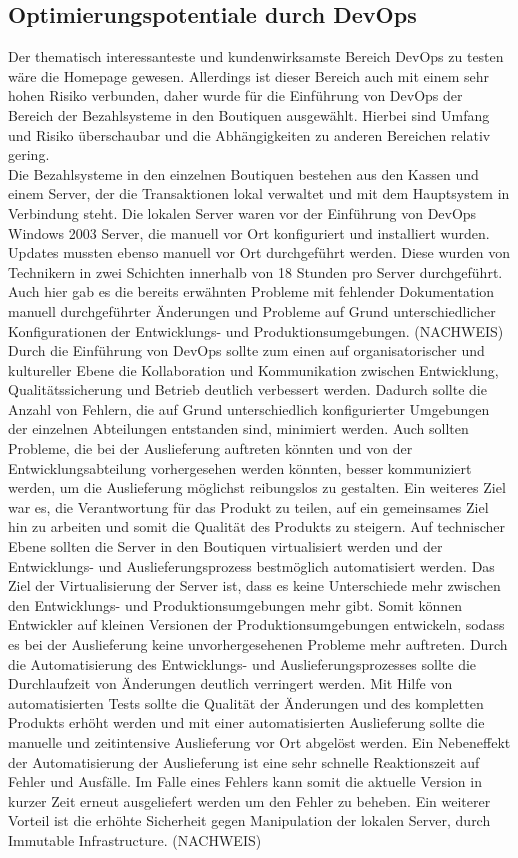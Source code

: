 \subsection{Optimierungspotentiale durch DevOps}
Der thematisch interessanteste und kundenwirksamste Bereich DevOps zu testen wäre die Homepage gewesen. Allerdings ist dieser Bereich auch mit einem sehr hohen Risiko verbunden, daher wurde für die Einführung von DevOps der Bereich der Bezahlsysteme in den Boutiquen ausgewählt. Hierbei sind Umfang und Risiko überschaubar und die Abhängigkeiten zu anderen Bereichen relativ gering.\\
Die Bezahlsysteme in den einzelnen Boutiquen bestehen aus den Kassen und einem Server, der die Transaktionen lokal verwaltet und mit dem Hauptsystem in Verbindung steht. Die lokalen Server waren vor der Einführung von DevOps Windows 2003 Server, die manuell vor Ort konfiguriert und installiert wurden. Updates mussten ebenso manuell vor Ort durchgeführt werden. Diese wurden von Technikern in zwei Schichten innerhalb von 18 Stunden pro Server durchgeführt. Auch hier gab es die bereits erwähnten Probleme mit fehlender Dokumentation manuell durchgeführter Änderungen und Probleme auf Grund unterschiedlicher Konfigurationen der Entwicklungs- und Produktionsumgebungen. (NACHWEIS)\\ 
Durch die Einführung von DevOps sollte zum einen auf organisatorischer und kultureller Ebene die Kollaboration und Kommunikation zwischen Entwicklung, Qualitätssicherung und Betrieb deutlich verbessert werden. Dadurch sollte die Anzahl von Fehlern, die auf Grund unterschiedlich konfigurierter Umgebungen der einzelnen Abteilungen entstanden sind, minimiert werden. Auch sollten Probleme, die bei der Auslieferung auftreten könnten und von der Entwicklungsabteilung vorhergesehen werden könnten, besser kommuniziert werden, um die Auslieferung möglichst reibungslos zu gestalten. Ein weiteres Ziel war es, die Verantwortung für das Produkt zu teilen, auf ein gemeinsames Ziel hin zu arbeiten und somit die Qualität des Produkts zu steigern. Auf technischer Ebene sollten die Server in den Boutiquen virtualisiert werden und der Entwicklungs- und Auslieferungsprozess bestmöglich automatisiert werden. Das Ziel der Virtualisierung der Server ist, dass es keine Unterschiede mehr zwischen den Entwicklungs- und Produktionsumgebungen mehr gibt. Somit können Entwickler auf kleinen Versionen der Produktionsumgebungen entwickeln, sodass es bei der Auslieferung keine unvorhergesehenen Probleme mehr auftreten. Durch die Automatisierung des Entwicklungs- und Auslieferungsprozesses sollte die Durchlaufzeit von Änderungen deutlich verringert werden. Mit Hilfe von automatisierten Tests sollte die Qualität der Änderungen und des kompletten Produkts erhöht werden und mit einer automatisierten Auslieferung sollte die manuelle und zeitintensive Auslieferung vor Ort abgelöst werden. Ein Nebeneffekt der Automatisierung der Auslieferung ist eine sehr schnelle Reaktionszeit auf Fehler und Ausfälle. Im Falle eines Fehlers kann somit die aktuelle Version in kurzer Zeit erneut ausgeliefert werden um den Fehler zu beheben. Ein weiterer Vorteil ist die erhöhte Sicherheit gegen Manipulation der lokalen Server, durch \glqq Immutable Infrastructure\grqq. (NACHWEIS)\\

